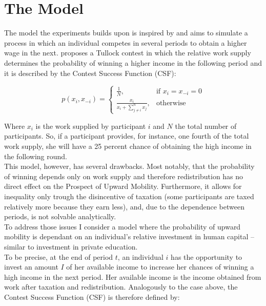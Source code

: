 \chapter{The Model}
\label{ch:model}
\thispagestyle{fancy}

The model the experiments builds upon is inspired by \cite{koch2017} and aims to simulate a process in which an individual competes in several periods to obtain a higher wage in the next. \cite{koch2017} proposes a Tullock contest in which the relative work supply determines the probability of winning a higher income in the following period and it is described by the Contest Success Function (CSF):

\begin{equation}
    p(x_i,x_{-i}) =
\begin{cases}
    \frac{1}{N},& \text{if } x_i = x_{-i} = 0\\
    \frac{x_i}{x_i + \sum_{j\neq i}^n x_{j}},              & \text{otherwise}
\end{cases}
\label{eq:csf}    
\end{equation}

\hfill \break

Where $x_i$ is the work supplied by participant $i$ and $N$ the total number of participants. So, if a participant provides, for instance, one fourth of the total work supply, she will have a 25 percent chance of obtaining the high income in the following round.\\

This model, however, has several drawbacks. Most notably, that the probability of winning depends only on work supply and therefore redistribution has no direct effect on the Prospect of Upward Mobility. Furthermore, it allows for inequality only trough the disincentive of taxation (some participants are taxed relatively more because they earn less), and, due to the dependence between periods, is not solvable analytically.\\ 

To address those issues I consider a model where the probability of upward mobility is dependant on an individual's relative investment in human capital –similar to investment in private education.\\ 

To be precise, at the end of period $t$, an individual $i$ has the opportunity to invest an amount $I$ of her available income to increase her chances of winning a high income in the next period. Her available income is the income obtained from work after taxation and redistribution. Analogously to the case above, the Contest Success Function (CSF) is therefore defined by:

